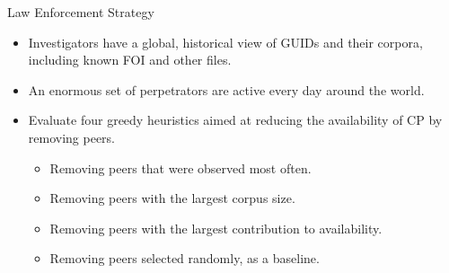 \documentclass[notes]{beamer}
\begin{document}
\begin{frame}
\begin{block}{Law Enforcement Strategy}
\begin{itemize}

\item[\checkmark] Investigators have a global, historical view of GUIDs and their corpora, including known FOI and other files. 
\item[\checkmark] An enormous set of perpetrators are active every day
around the world.
\item[\checkmark] Evaluate four greedy heuristics aimed at reducing the availability of CP by removing peers.

\begin{itemize}

\item Removing peers that were observed most often.
\item Removing peers with the largest corpus size.
\item Removing peers with the largest contribution to availability.
\item Removing peers selected randomly, as a baseline.

\end{itemize}
\end{itemize}
\end{block}
\end{frame}
\end{document}
